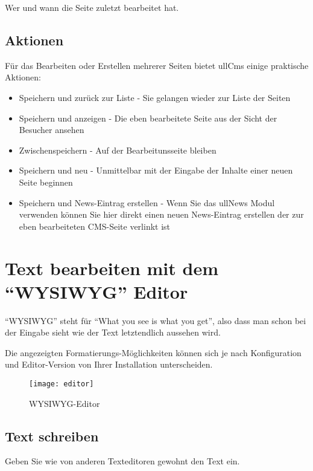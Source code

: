 \documentclass[article, a4paper, oneside, 11pt]{memoir}
\begin{document}
Wer und wann die Seite zuletzt bearbeitet hat.



\section{Aktionen}

Für das Bearbeiten oder Erstellen mehrerer Seiten bietet ullCms einige praktische Aktionen:

\begin{itemize}
\item Speichern und zurück zur Liste - Sie gelangen wieder zur Liste der Seiten
\item Speichern und anzeigen - Die eben bearbeitete Seite aus der Sicht der Besucher ansehen
\item Zwischenspeichern - Auf der Bearbeitunsseite bleiben
\item Speichern und neu - Unmittelbar mit der Eingabe der Inhalte einer neuen Seite beginnen
\item Speichern und News-Eintrag erstellen - Wenn Sie das ullNews Modul verwenden können Sie hier direkt einen neuen News-Eintrag erstellen der zur eben bearbeiteten CMS-Seite verlinkt ist
\end{itemize}



\chapter{Text bearbeiten mit dem "`WYSIWYG"' Editor}
\label{sec:editor}

"`WYSIWYG"' steht für "`What you see is what you get"',  also dass man schon bei der Eingabe sieht wie der Text letztendlich aussehen wird.

Die angezeigten Formatierungs-Möglichkeiten können sich je nach Konfiguration und Editor-Version von Ihrer Installation unterscheiden.

\begin{figure}[htp]
\centering
\texttt{[image: editor]}
\caption{WYSIWYG-Editor}
\label{fig:editor}
\end{figure}

\section{Text schreiben}

Geben Sie wie von anderen Texteditoren gewohnt den Text ein.
\end{document}
